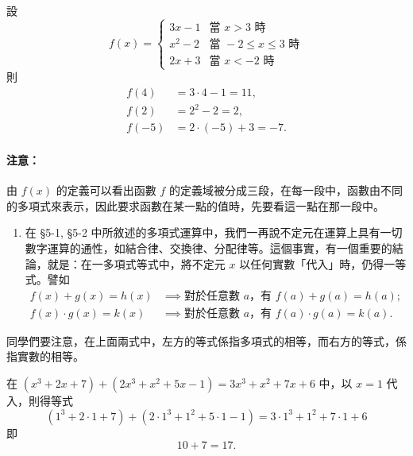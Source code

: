 \begin{example}\label{ex:5-3-8}
設
\begin{equation*}
  f(x) = \begin{cases}
    3x-1 & \text{當 } x > 3 \text{ 時} \\
    x^2-2 & \text{當 } -2 \le x \le 3 \text{ 時} \\
    2x+3 & \text{當 } x < -2 \text{ 時}
  \end{cases}
\end{equation*}
則
\begin{align*}
  f(4) &= 3 \cdot 4 - 1 = 11, \\
  f(2) &= 2^2 - 2 = 2, \\
  f(-5) &= 2 \cdot (-5) + 3 = -7.
\end{align*}
\end{example}

\paragraph{注意：}
由 $f(x)$ 的定義可以看出函數 $f$ 的定義域被分成三段，在每一段中，函數由不同的多項式來表示，因此要求函數在某一點的值時，先要看這一點在那一段中。

\begin{enumerate}[label=(\roman*), start=3]
  \item 在 \S 5-1, \S 5-2 中所敘述的多項式運算中，我們一再說不定元在運算上具有一切數字運算的通性，如結合律、交換律、分配律等。這個事實，有一個重要的結論，就是：在一多項式等式中，將不定元 $x$ 以任何實數「代入」時，仍得一等式。譬如
  \begin{align*}
    f(x)+g(x)=h(x) &\implies \text{對於任意數 $a$，有 } f(a)+g(a)=h(a); \\
    f(x) \cdot g(x)=k(x) &\implies \text{對於任意數 $a$，有 } f(a) \cdot g(a)=k(a).
  \end{align*}
\end{enumerate}

同學們要注意，在上面兩式中，左方的等式係指多項式的相等，而右方的等式，係指實數的相等。

\begin{example}\label{ex:5-3-9}
在 $(x^3+2x+7)+(2x^3+x^2+5x-1)=3x^3+x^2+7x+6$ 中，以 $x=1$ 代入，則得等式
\begin{equation*}
  (1^3+2 \cdot 1+7)+(2 \cdot 1^3+1^2+5 \cdot 1-1) = 3 \cdot 1^3+1^2+7 \cdot 1+6
\end{equation*}
即
\begin{equation*}
  10+7 = 17.
\end{equation*}
\end{example}

